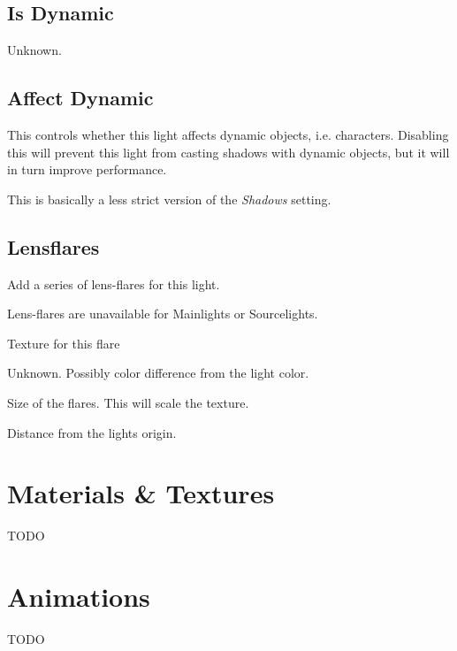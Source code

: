 \subsection*{Is Dynamic}
Unknown.

\subsection*{Affect Dynamic}
This controls whether this light affects dynamic objects, i.e. characters.
Disabling this will prevent this light from casting shadows with dynamic
objects, but it will in turn improve performance.

This is basically a less strict version of the \textit{Shadows} setting.

\subsection*{Lensflares}
Add a series of lens-flares for this light.

Lens-flares are unavailable for Mainlights or Sourcelights.
\begin{description}[leftmargin=6em,style=nextline]
    \item[Texture] Texture for this flare
    \item[Colorshift] Unknown. Possibly color difference from the light color.
    \item[Size] Size of the flares. This will scale the texture.
    \item[Position] Distance from the lights origin.
\end{description}

\section{Materials \& Textures}
TODO

\section{Animations}
TODO